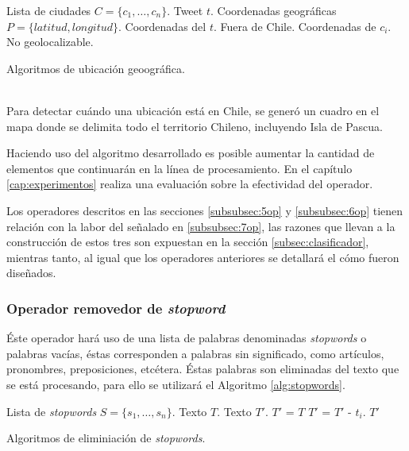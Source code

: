 \begin{algorithm}[H]
	\begin{algorithmic}
		\REQUIRE Lista de ciudades $C=\{c_{1}, \dots, c_{n} \}$.
		\REQUIRE Tweet $t$.
		\ENSURE Coordenadas geográficas $P=\{latitud, longitud\}$.
				\RETURN Coordenadas del $t$.
			\ELSE
				\RETURN Fuera de Chile.
			\ENDIF
		\ELSE
				\RETURN Coordenadas de $c_{i}$.
			\ELSE
				\RETURN No geolocalizable.
			\ENDIF
		\ENDIF
	\end{algorithmic}
	\caption{Algoritmos de ubicación geoográfica.}
	\label{alg:geolocalizacion}
\end{algorithm}\vphantom\\

Para detectar cuándo una ubicación está en Chile, se generó un cuadro en el mapa donde se delimita todo el territorio Chileno, incluyendo Isla de Pascua.

Haciendo uso del algoritmo desarrollado es posible aumentar la cantidad de elementos que continuarán en la línea de procesamiento. En el capítulo \ref{cap:experimentos} realiza una evaluación sobre la efectividad del operador.

Los operadores descritos en las secciones \ref{subsubsec:5op} y \ref{subsubsec:6op} tienen relación con la labor del señalado en \ref{subsubsec:7op}, las razones que llevan a la construcción de estos tres son expuestan en la sección \ref{subsec:clasificador}, mientras tanto, al igual que los operadores anteriores se detallará el cómo fueron diseñados.

\subsubsection*{Operador removedor de \textit{stopword}}
\label{subsubsec:5op}

Éste operador hará uso de una lista de palabras denominadas \textit{stopwords} o palabras vacías, éstas corresponden a palabras sin significado, como artículos, pronombres, preposiciones, etcétera. Éstas palabras son eliminadas del texto que se está procesando, para ello se utilizará el Algoritmo \ref{alg:stopwords}.\\

\begin{algorithm}[H]
	\begin{algorithmic}
		\REQUIRE Lista de \textit{stopwords} $S=\{s_{1}, \dots, s_{n} \}$.
		\REQUIRE Texto $T$.
		\ENSURE Texto $T'$.
		\STATE $T'$ = $T$
			\STATE $T'$ = $T'$ - $t_{i}$. 
			\ENDIF
		\ENDFOR
		\RETURN $T'$
	\end{algorithmic}
	\caption{Algoritmos de eliminiación de \textit{stopwords}.}
	\label{alg:stopwords}
\end{algorithm}\vphantom\\

